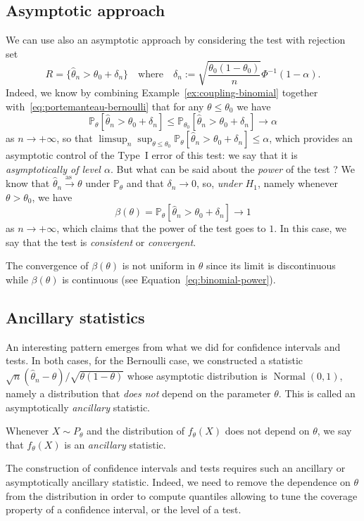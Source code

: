 \documentclass[
	fontsize=11pt, %
	twoside=false, %
	numbers=noenddot, %
]{kaobook}
\DeclareMathOperator{\nor}{Normal}
\renewcommand{\P}{\mathbb P}
\newcommand{\wh}{\widehat}
\newcommand{\goes}{\rightarrow}
\newcommand{\go}{\rightarrow}
\newcommand{\goas}{\overset{\text{as\ }}{\rightarrow}}
\begin{document}
\subsection{Asymptotic approach}

We can use also an asymptotic approach by considering the test with rejection set
\begin{equation*}
	R = \big\{ \wh \theta_n > \theta_0  + \delta_n \big\} \quad \text{where} \quad \delta_n	:= \sqrt{\frac{\theta_0 (1 - \theta_0)}{n}} \Phi^{-1}(1 - \alpha).
\end{equation*}
Indeed, we know by combining Example~\ref{ex:coupling-binomial} together with~\eqref{eq:portemanteau-bernoulli} that for any $\theta \leq \theta_0$ we have
\begin{equation*}
	\P_\theta[ \wh \theta_n > \theta_0  + \delta_n ] \leq \P_{\theta_0}[ \wh \theta_n > \theta_0  + \delta_n ] \goes \alpha
\end{equation*}
as $n \goes +\infty$, so that $\limsup_n \sup_{\theta \leq \theta_0} \P_\theta[ \wh \theta_n > \theta_0  + \delta_n ] \leq \alpha$, which provides an asymptotic control of the Type~I error of this test: we say that it is \emph{asymptotically of level $\alpha$}.
But what can be said about the \emph{power} of the test ?
We know that $\wh \theta_n \goas \theta$ under $\P_\theta$ and that $\delta_n \go 0$, so, \emph{under $H_1$}, namely whenever $\theta > \theta_0$, we have
\begin{equation*}
	\beta(\theta) = \P_\theta[ \wh \theta_n > \theta_0 + \delta_n] \go 1
\end{equation*}
as $n \go +\infty$, which claims that the power of the test goes to $1$.
In this case, we say that the test is \emph{consistent} or \emph{convergent}.
\begin{remark}
 	The convergence of $\beta(\theta)$ is not uniform in $\theta$ since its limit is discontinuous while $\beta(\theta)$ is continuous (see Equation~\eqref{eq:binomial-power}).
\end{remark}

\subsection{Ancillary statistics} %


An interesting pattern emerges from what we did for confidence intervals and tests.
In both cases, for the Bernoulli case, we constructed a statistic 
$\sqrt n (\wh \theta_n - \theta) / \sqrt{\theta (1 - \theta)}$ whose asymptotic distribution is $\nor(0, 1)$, namely a distribution that \emph{does not} depend on the parameter $\theta$.
This is called an asymptotically \emph{ancillary} statistic.
\begin{definition}
	Whenever $X \sim P_\theta$ and the distribution of $f_\theta(X)$ does not depend on $\theta$, we say that $f_\theta(X)$ is an \emph{ancillary} statistic.
\end{definition}
The construction of confidence intervals and tests requires such an ancillary or asymptotically ancillary statistic.
Indeed, we need to remove the dependence on $\theta$ from the distribution in order to compute quantiles allowing to tune the coverage property of a confidence interval, or the level of a test.
\end{document}
